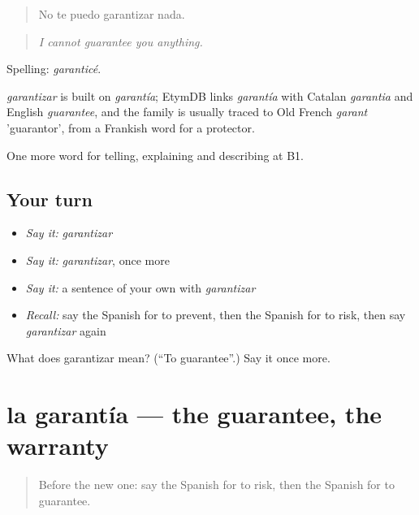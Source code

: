 \begin{quote}
No te puedo garantizar nada.
\end{quote}

\begin{quote}
\emph{I cannot guarantee you anything.}
\end{quote}

Spelling: \emph{garanticé}.

\begin{cousinweb}
\emph{garantizar} is built on \emph{garantía}; EtymDB links \emph{garantía} with Catalan \emph{garantia} and English \emph{guarantee}, and the family is usually traced to Old French \emph{garant} 'guarantor', from a Frankish word for a protector.
\end{cousinweb}

\begin{grammarlens}[title={What you've built}]
One more word for telling, explaining and describing at B1.
\end{grammarlens}

\subsection*{Your turn}
\begin{itemize}
\raggedright
  \item \emph{Say it:} \emph{garantizar}
  \item \emph{Say it:} \emph{garantizar}, once more
  \item \emph{Say it:} a sentence of your own with \emph{garantizar}
  \item \emph{Recall:} say the Spanish for to prevent, then the Spanish for to risk, then say \emph{garantizar} again
\end{itemize}

\begin{tcolorbox}[breakable,colback=teal!4,colframe=teal!35!black,title={Before you move on}]
What does garantizar mean? (\textquotedblleft{}To guarantee\textquotedblright{}.) Say it once more.
\end{tcolorbox}
\section[la garantía]{la garantía — the guarantee, the warranty}

\label{lesson:ES-C614-garantia}



\begin{quote}
Before the new one: say the Spanish for to risk, then the Spanish for to guarantee.
\end{quote}

